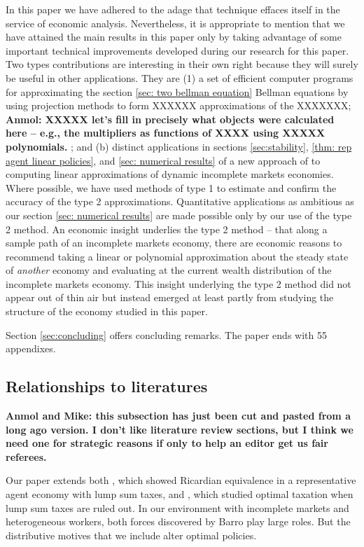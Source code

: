 \documentclass[thmsb,11pt]{article}
\begin{document}
In this paper we have adhered to the adage that technique effaces itself in the service of economic analysis.  
Nevertheless, it is appropriate to mention that we have attained the main results in this paper only
by taking advantage of some important technical improvements developed during our research for this paper. 
Two types  contributions are interesting in their own right because they will surely be useful in other applications. They are
(1) a set of efficient computer programs for approximating the section \ref{sec: two bellman equation} Bellman equations by using
projection methods  to form XXXXXX approximations of the XXXXXXX;  \textbf{Anmol: XXXXX let's fill in precisely what objects were calculated here -- e.g., the multipliers as functions of XXXX using XXXXX polynomials. } ; and (b)  distinct applications in sections 
\ref{sec:stability},  \ref{thm: rep agent linear policies}, and  \ref{sec: numerical results} of a new approach of \cite{Evans2014} to computing linear approximations
of dynamic incomplete markets economies.  Where possible, we have used methods of type 1 to estimate and confirm the accuracy of the type 2 approximations.
Quantitative applications as ambitious as our section \ref{sec: numerical results} are made possible only by our use of the type 2 method.  
An economic insight underlies the  type 2 method -- that along a sample path of an incomplete markets economy, there are economic reasons to recommend taking
a linear or polynomial approximation about the steady state of {\em another} economy and evaluating at the current wealth distribution  of
the incomplete markets economy.  This insight underlying the  type 2 method did not appear out of thin air but instead emerged
at least partly from studying the structure of the economy studied in this paper. 

Section \ref{sec:concluding} offers concluding remarks.  The paper ends with 55 appendixes.



\subsection{Relationships to literatures}
\textbf{Anmol and Mike: this subsection has just been cut and pasted from a long ago version. I don't like literature review sections, but
I think we need one for strategic reasons if only to help an editor get us fair referees.}

Our paper extends both \citet{Barro1974}, which showed Ricardian equivalence in a representative agent economy with lump sum taxes,
and \citet{Barro1979}, which studied  optimal taxation  when lump sum taxes are ruled out. In our environment with incomplete markets and heterogeneous workers,
both forces discovered by Barro play large roles.  But the distributive motives that we include alter optimal policies.
\end{document}
